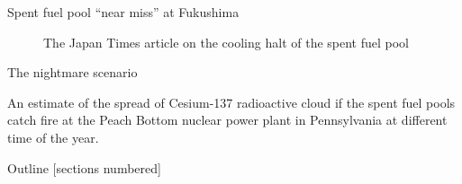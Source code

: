 \documentclass[10pt]{beamer}
\begin{document}
\begin{frame}{Spent fuel pool ``near miss'' at Fukushima}
{\begin{figure}
		\caption*{The Japan Times article on the cooling halt of the spent fuel pool}
		\end{figure}
        }
\end{frame}

\begin{frame}{The nightmare scenario}
\begin{figure}
\centering
{}
\end{figure}
An estimate of the spread of Cesium-137 radioactive cloud if the spent fuel pools catch fire at the Peach Bottom nuclear power plant in Pennsylvania at different time of the year. \cite{s16}
\end{frame}

\begin{frame}{Outline}
  [sections numbered]
  \tableofcontents[hideallsubsections]
\end{frame}
\end{document}
